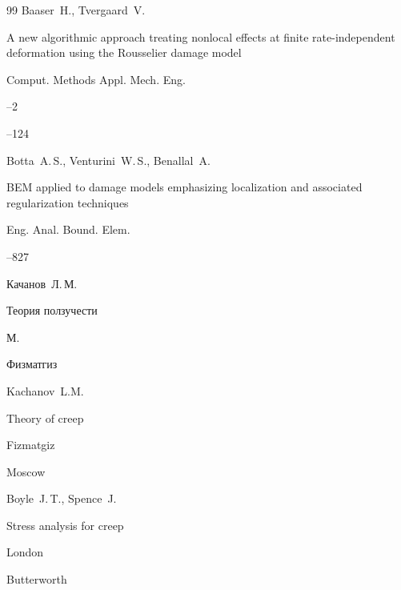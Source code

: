 \begin{thebibliography}{99}
\by Baaser~H., Tvergaard~V.

\paper A new algorithmic approach treating nonlocal effects at finite rate-independent deformation using the Rousselier damage model

\jour Comput. Methods Appl. Mech. Eng.



--2

--124






\by Botta~A.\,S., Venturini~W.\,S., Benallal~A.

\paper BEM applied to damage models emphasizing localization and associated regularization techniques

\jour Eng. Anal. Bound. Elem.




--827








\by Качанов~Л.\,М.

\book Теория ползучести

\publaddr М.

\publ Физматгиз



\misctransl

\by Kachanov~L.M.

\book Theory of creep 

\publ Fizmatgiz

\publaddr Moscow 








\by Boyle~J.\,T., Spence~J.

\book Stress analysis for creep

\publaddr London

\publ Butterworth






\end{thebibliography}
